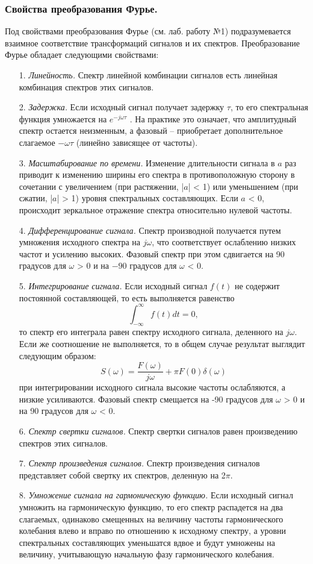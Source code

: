 \documentclass[a4paper,14pt]{extarticle}
\begin{document}
\subsubsection{Свойства преобразования Фурье.}
Под свойствами преобразования Фурье (см. лаб. работу №1) подразумевается взаимное соответствие трансформаций сигналов и их спектров. Преобразование Фурье обладает следующими свойствами:
\begin{itemize}
\item[1.] \textit{Линейность.} Спектр линейной комбинации сигналов есть линейная комбинация спектров этих сигналов.
\item[2.] \textit{Задержка.} Если исходный сигнал получает задержку $\tau$, то его спектральная функция умножается на $e^{-j\omega \tau}$ . На практике это означает, что амплитудный спектр остается неизменным, а фазовый -- приобретает
дополнительное слагаемое $-\omega \tau$ (линейно зависящее от частоты).
\item[3.] \textit{Масштабирование по времени.} Изменение длительности сигнала в $a$ раз приводит к изменению ширины его спектра в противоположную сторону в сочетании с увеличением (при растяжении, |$a$| < 1) или уменьшением (при сжатии, |$a$| > 1) уровня спектральных составляющих. Если
$a$ < 0, происходит зеркальное отражение спектра относительно нулевой
частоты.
\item[4.] \textit{Дифференцирование сигнала.} Спектр производной получается путем умножения исходного спектра на $j \omega$, что соответствует ослаблению
низких частот и усилению высоких. Фазовый спектр при этом сдвигается на 90 градусов для $\omega$ > 0 и на $-90$ градусов для $\omega$ < 0.
\item[5.] \textit{Интегрирование сигнала.} Если исходный сигнал $f (t)$ не содержит постоянной составляющей, то есть выполняется равенство
$$\int^{\infty}_{-\infty} f(t) dt = 0,$$ то спектр его интеграла равен спектру исходного сигнала, деленного на $j \omega$. Если же соотношение не выполняется, то в общем случае результат выглядит следующим образом:
$$S(\omega) = \frac{F(\omega)}{j\omega} + \pi F(0)\delta(\omega)$$ при интегрировании исходного сигнала высокие частоты ослабляются, а низкие усиливаются. Фазовый спектр смещается на -90 градусов для
$\omega$ > 0 и на 90 градусов для $\omega$ < 0.
\item[6.] \textit{Спектр свертки сигналов.} Спектр свертки сигналов равен произведению спектров этих сигналов.
\item[7.] \textit{Спектр произведения сигналов.} Спектр произведения сигналов представляет собой свертку их спектров, деленную на 2$\pi$.
\item[8.] \textit{Умножение сигнала на гармоническую функцию.} Если исходный
сигнал умножить на гармоническую функцию, то его спектр распадется
на два слагаемых, одинаково смещенных на величину частоты гармонического колебания влево и вправо по отношению к исходному спектру, а уровни спектральных составляющих уменьшатся вдвое и будут
умножены на величину, учитывающую начальную фазу гармонического колебания.
\end{itemize}
\end{document}
